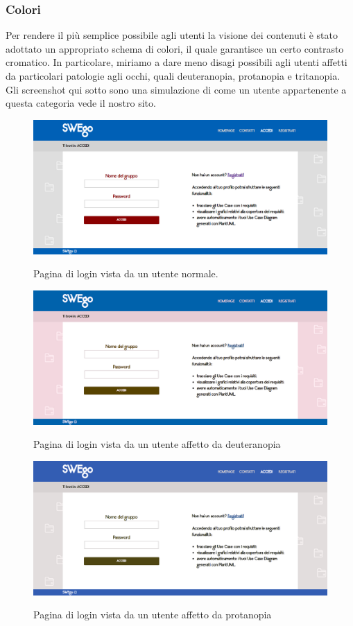 \subsubsection{Colori}
Per rendere il più semplice possibile agli utenti la visione dei contenuti è stato adottato un appropriato schema di colori, il quale garantisce un certo contrasto cromatico.
	In particolare, miriamo a dare meno disagi possibili agli utenti affetti da particolari patologie agli occhi, quali deuteranopia, protanopia e tritanopia. \\
	Gli screenshot qui sotto sono una simulazione di come un utente appartenente a questa categoria vede il nostro sito.\\
	\begin{figure}
	\centering
		\includegraphics[scale=0.4]{img/normale.png}\\[1cm] \caption{Pagina di login vista da un utente normale.}
	\end{figure}
	\begin{figure}
	\centering
		\includegraphics[scale=0.3]{img/deuteranopia.png}\\[1cm] \caption{Pagina di login vista da un utente affetto da deuteranopia}
	\end{figure}
	\begin{figure}
	\centering
		\includegraphics[scale=0.3]{img/protanopia.png}\\[1cm] \caption{Pagina di login vista da un utente affetto da protanopia}
	\end{figure}
